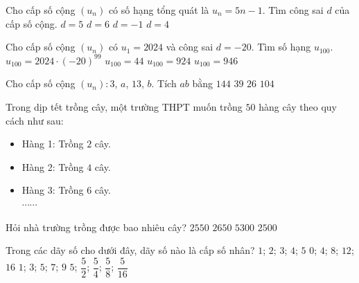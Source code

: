 \begin{ex}%
	Cho cấp số cộng $\left(u_n\right)$ có số hạng tổng quát là $u_n=5n-1$. Tìm công sai $d$ của cấp số cộng.
	\choice
	{\True $d=5$}
	{$d=6$}
	{$d=-1$}
	{$d=4$}
\end{ex}


\begin{ex}%
	Cho cấp số cộng $\left(u_n\right)$ có $u_1=2024$ và công sai $ d=-20$. Tìm số hạng $u_{100}$.
	\choice
	{$u_{100}=2024\cdot \left(-20\right)^{99}$}
	{\True $u_{100}=44$}
	{$u_{100}=924$}
	{$u_{100}=946$}
\end{ex}

\begin{ex}%
Cho cấp số cộng $\left(u_n\right)\colon 3$, $a$, $13$, $b$. Tích $ab$ bằng
	\choice
	{\True $144$}
	{$39$}
	{$26$}
	{$104$}
\end{ex}


\begin{ex}%
	Trong dịp tết trồng cây, một trường THPT muốn trồng $50$ hàng cây theo quy cách như sau:
	\begin{itemize}
		\item Hàng 1: Trồng $2$ cây.
	\item Hàng 2: Trồng $4$ cây.
	\item Hàng 3: Trồng $6$ cây.\\
	$\cdots \cdots$	
\end{itemize}
	Hỏi nhà trường trồng được bao nhiêu cây?
	\choice
	{\True $ 2550$}
	{$ 2650$}
	{$ 5300$}
	{$ 2500$}
\end{ex}


\begin{ex}%
	Trong các dãy số cho dưới đây, dãy số nào là cấp số nhân?
	\choice
	{$1$; $2$; $3$; $4$; $5$}
	{$0$; $4$; $8$; $12$; $16$}
	{$1$; $3$; $5$; $7$; $9$}
	{\True $ 5$; $\dfrac{5}{2}$; $\dfrac{5}{4}$; $\dfrac{5}{8}$; $\dfrac{5}{16}$}
\end{ex}

